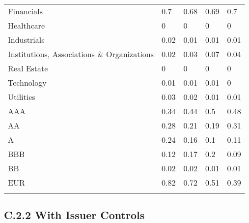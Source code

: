 \begin{table}[H]
\begin{tabular}{lllll}
Financials & \cellcolor[HTML]{80CA94}0.7 & \cellcolor[HTML]{84CB97}0.68 & \cellcolor[HTML]{82CB96}0.69 & \cellcolor[HTML]{80CA94}0.7 \\
Healthcare & \cellcolor[HTML]{FCFCFF}0 & \cellcolor[HTML]{FCFCFF}0 & \cellcolor[HTML]{FCFCFF}0 & \cellcolor[HTML]{FCFCFF}0 \\
Industrials & \cellcolor[HTML]{F9FBFC}0.02 & \cellcolor[HTML]{FBFCFE}0.01 & \cellcolor[HTML]{FBFCFE}0.01 & \cellcolor[HTML]{FBFCFE}0.01 \\
Institutions,   Associations \& Organizations & \cellcolor[HTML]{F9FBFC}0.02 & \cellcolor[HTML]{F7FAFB}0.03 & \cellcolor[HTML]{F0F7F5}0.07 & \cellcolor[HTML]{F5FAF9}0.04 \\
Real Estate & \cellcolor[HTML]{FCFCFF}0 & \cellcolor[HTML]{FCFCFF}0 & \cellcolor[HTML]{FCFCFF}0 & \cellcolor[HTML]{FCFCFF}0 \\
Technology & \cellcolor[HTML]{FBFCFE}0.01 & \cellcolor[HTML]{FBFCFE}0.01 & \cellcolor[HTML]{FBFCFE}0.01 & \cellcolor[HTML]{FCFCFF}0 \\
Utilities & \cellcolor[HTML]{F7FAFB}0.03 & \cellcolor[HTML]{F9FBFC}0.02 & \cellcolor[HTML]{FBFCFE}0.01 & \cellcolor[HTML]{FBFCFE}0.01 \\
AAA & \cellcolor[HTML]{C0E4CB}0.34 & \cellcolor[HTML]{AEDDBC}0.44 & \cellcolor[HTML]{A4D8B3}0.5 & \cellcolor[HTML]{A7DAB6}0.48 \\
AA & \cellcolor[HTML]{CBE8D5}0.28 & \cellcolor[HTML]{D7EDDF}0.21 & \cellcolor[HTML]{DBEFE2}0.19 & \cellcolor[HTML]{C5E6D0}0.31 \\
A & \cellcolor[HTML]{D2EBDB}0.24 & \cellcolor[HTML]{E0F1E7}0.16 & \cellcolor[HTML]{EBF5F0}0.1 & \cellcolor[HTML]{E9F5EF}0.11 \\
BBB & \cellcolor[HTML]{E7F4ED}0.12 & \cellcolor[HTML]{DEF0E5}0.17 & \cellcolor[HTML]{D9EEE1}0.2 & \cellcolor[HTML]{ECF6F2}0.09 \\
BB & \cellcolor[HTML]{F9FBFC}0.02 & \cellcolor[HTML]{F9FBFC}0.02 & \cellcolor[HTML]{FBFCFE}0.01 & \cellcolor[HTML]{FBFCFE}0.01 \\
EUR & \cellcolor[HTML]{6BC182}0.82 & \cellcolor[HTML]{7CC991}0.72 & \cellcolor[HTML]{A2D8B1}0.51 & \cellcolor[HTML]{B7E0C4}0.39 \\
\hline \\[-1.8ex] 
\end{tabular}
\end{table}

\newpage

\subsection{C.2.2 With Issuer Controls}

